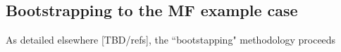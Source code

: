 \subsection{Bootstrapping to the MF example case}

As detailed elsewhere [TBD/refs], the ``bootstapping" methodology proceeds 
